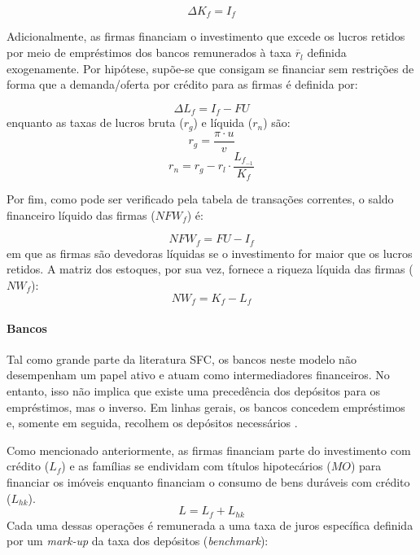 \begin{equation}
    \Delta K_f = I_f
\end{equation}

Adicionalmente, as firmas financiam o investimento que excede os lucros retidos por meio de empréstimos dos bancos remunerados à taxa $\overline r_l$ definida exogenamente. Por hipótese, supõe-se que consigam se financiar sem restrições de forma que a demanda/oferta por crédito para as firmas é definida por:

\begin{equation}
    \Delta L_f = I_f - FU
\end{equation}
enquanto as taxas de lucros bruta ($r_g$) e líquida ($r_n$) são:
$$
r_g = \frac{\pi\cdot u}{v}
$$
$$
r_n = r_g - r_l\cdot\frac{L_{f_{-1}}}{K_f}
$$

Por fim, como pode ser verificado pela tabela de transações correntes, o saldo financeiro líquido das firmas ($NFW_f$) é:

\begin{equation}
    NFW_f = FU - I_f
\end{equation}
em que as firmas são devedoras líquidas se o investimento for maior que os lucros retidos. 
A matriz dos estoques, por sua vez, fornece a riqueza líquida das firmas ($NW_f$):
\begin{equation}
    NW_f = K_f - L_f
\end{equation}

\paragraph*{Bancos} Tal como grande parte da literatura SFC, os bancos neste modelo não desempenham um papel ativo e atuam como intermediadores financeiros. No entanto, isso não implica que existe uma precedência dos depósitos para os empréstimos, mas o inverso. Em linhas gerais, os bancos concedem empréstimos e, somente em seguida, recolhem os depósitos necessários \cite{le_bourva_money_1992}. 

Como mencionado anteriormente, as firmas financiam parte do investimento com crédito ($L_f$) e as famílias se endividam com títulos hipotecários ($MO$) para financiar os imóveis enquanto financiam o consumo de bens duráveis com crédito ($L_{hk}$). 
\begin{equation}
L = L_f + L_{hk}
\end{equation}
Cada uma dessas operações é remunerada a uma taxa de juros específica definida por um \textit{mark-up} da taxa dos depósitos (\textit{benchmark}):

